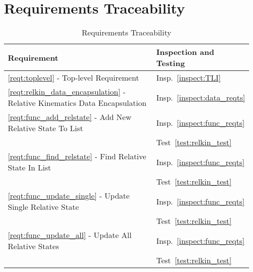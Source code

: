 \newpage
\section{Requirements Traceability}\label{sec:traceability}

\begin{longtable}[c]{||p{3in}|p{3in}|}
\caption{Requirements Traceability} \\[6pt]
\hline
{\bf Requirement} & {\bf Inspection and Testing} \\
\hline \hline
\endhead

\ref{reqt:toplevel} - Top-level Requirement &
  Insp.~\ref{inspect:TLI} \\
  \hline

\ref{reqt:relkin_data_encapsulation} - Relative Kinematics Data Encapsulation &
   Insp.~\ref{inspect:data_reqts} \\
\hline

\ref{reqt:func_add_relstate} - Add New Relative State To List &
   Insp.~\ref{inspect:func_reqts} \\
   &Test~\ref{test:relkin_test} \\
\hline

\ref{reqt:func_find_relstate} - Find Relative State In List &
   Insp.~\ref{inspect:func_reqts} \\
   &Test~\ref{test:relkin_test} \\
\hline

\ref{reqt:func_update_single} - Update Single Relative State &
   Insp.~\ref{inspect:func_reqts} \\
   &Test~\ref{test:relkin_test} \\
\hline

\ref{reqt:func_update_all} - Update All Relative States &
   Insp.~\ref{inspect:func_reqts} \\
   &Test~\ref{test:relkin_test} \\
\hline

\end{longtable}

